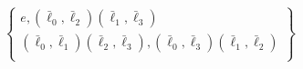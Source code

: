 \documentclass[preview]{standalone}
\begin{document}
\begin{align*}
\begin{Bmatrix}    e,(\bar{\ell}_0,\bar{\ell}_2)(\bar{\ell}_1,\bar{\ell}_3)\\    (\bar{\ell}_0,\bar{\ell}_1)(\bar{\ell}_2,\bar{\ell}_3),(\bar{\ell}_0,\bar{\ell}_3)(\bar{\ell}_1,\bar{\ell}_2)\\\end{Bmatrix}
\end{align*}
\end{document}
